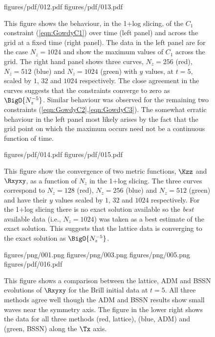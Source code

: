 \documentclass[a4paper,12pt]{article}
\numberwithin{equation}{section}
\begin{document}
\newpage

\begin{figure}[!ht]
\FigPair%
{figures/pdf/012.pdf}{\mywd}%
{figures/pdf/013.pdf}{\mywd}%
\caption{This figure shows the behaviour, in the 1+log slicing, of the $C_1$
constraint (\ref{eqn:GowdyC1}) over time (left panel) and across the grid at a
fixed time (right panel). The data in the left panel are for the case
$N_z=1024$ and show the maximum values of $C_1$ across the grid. The right
hand panel shows three curves, $N_z=256$ (red), $N_z=512$ (blue) and
$N_z=1024$ (green) with $y$ values, at $t=5$, scaled by $1$, $32$ and $1024$
respectively. The close agreement in the curves suggests that the constraints
converge to zero as $\BigO{N_z^{-5}}$. Similar behaviour was observed for the
remaining two constraints (\ref{eqn:GowdyC2},\ref{eqn:GowdyC3}). The somewhat
erratic behaviour in the left panel most likely arises by the fact that the
grid point on which the maximum occurs need not be a continuous function of
time.}
\label{fig:GowdyD}
\end{figure}


\begin{figure}[!ht]
\FigPair%
{figures/pdf/014.pdf}{\mywd}%
{figures/pdf/015.pdf}{\mywd}%
\caption{This figure show the convergence of two metric functions, $\Kzz$ and
$\Rxyxy$, as a function of $N_z$ in the 1+log slicing. The three curves
correspond to $N_z=128$ (red), $N_z=256$ (blue) and $N_z=512$ (green) and have
their $y$ values scaled by $1$, $32$ and $1024$ respectively. For the 1+log
slicing there is no exact solution available so the \emph{best} available data
(i.e., $N_z=1024$) was taken as a best estimate of the exact solution. This
suggests that the lattice data is converging to the exact solution as
$\BigO{N_z^{-5}}$.}
\label{fig:GowdyE}
\end{figure}

\newpage

\begin{figure}[!ht]
\FigPair%
{figures/png/001.png}{\mywd}%
{figures/png/003.png}{\mywd}%
\FigPair%
{figures/png/005.png}{\mywd}%
{figures/pdf/016.pdf}{\mywd}%
\caption{This figure shows a comparison between the lattice, ADM and BSSN
evolutions of $\Rxyxy$ for the Brill initial data at $t=5$. All three methods
agree well though the ADM and BSSN results show small waves near the symmetry
axis. The figure in the lower right shows the data for all three methods
(red, lattice), (blue, ADM) and (green, BSSN) along the $\Tx$ axis.}
\label{fig:BrillProfile05}
\end{figure}
\end{document}
